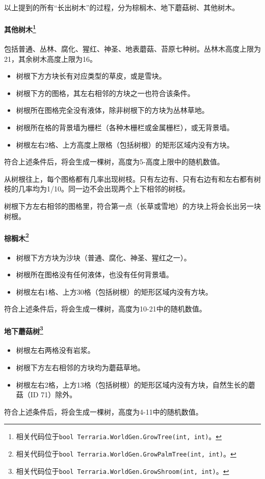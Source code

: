 以上提到的所有“长出树木”的过程，分为棕榈木、地下蘑菇树、其他树木。

\paragraph*{其他树木\footnote{相关代码位于\lstinline{bool Terraria.WorldGen.GrowTree(int, int)}。}}
包括普通、丛林、腐化、猩红、神圣、地表蘑菇、苔原七种树。丛林木高度上限为21，其余树木高度上限为16。

\begin{itemize}
\item 树根下方方块长有对应类型的草皮，或是雪块。
\item 树根下方的图格，其左右相邻的方块之一也符合该条件。
\item 树根所在图格完全没有液体，除非树根下的方块为丛林草地。
\item 树根所在格的背景墙为栅栏（各种木栅栏或金属栅栏），或无背景墙。
\item 树根左右2格、上方高度上限格（包括树根）的矩形区域内没有方块。
\end{itemize}
符合上述条件后，将会生成一棵树，高度为5-高度上限中的随机数值。

从树根往上，每个图格都有几率出现树枝。只有左边有、只有右边有和左右都有树枝的几率均为1/10。同一边不会出现两个上下相邻的树枝。

树根下方左右相邻的图格里，符合第一点（长草或雪地）的方块上将会长出另一块树根。

\paragraph*{棕榈木\footnote{相关代码位于\lstinline{bool Terraria.WorldGen.GrowPalmTree(int, int)}。}}
\begin{itemize}
\item 树根下方方块为沙块（普通、腐化、神圣、猩红之一）。
\item 树根所在图格没有任何液体，也没有任何背景墙。
\item 树根左右1格、上方30格（包括树根）的矩形区域内没有方块。
\end{itemize}
符合上述条件后，将会生成一棵树，高度为10-21中的随机数值。

\paragraph*{地下蘑菇树\footnote{相关代码位于\lstinline{bool Terraria.WorldGen.GrowShroom(int, int)}。}}
\begin{itemize}
\item 树根左右两格没有岩浆。
\item 树根下方左右相邻的方块均为蘑菇草地。
\item 树根左右2格，上方13格（包括树根）的矩形区域内没有方块，自然生长的蘑菇（ID 71）除外。
\end{itemize}
符合上述条件后，将会生成一棵树，高度为4-11中的随机数值。

